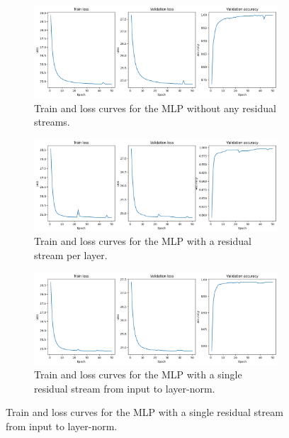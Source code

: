 \begin{figure}
    \centering
    \begin{subfigure}{0.9\textwidth}
        \includegraphics[width=\textwidth]{figures/no-residual-train-curves.png}
        \caption{Train and loss curves for the MLP without any residual streams.}
        \label{fig:nr-train-curves}
    \end{subfigure}

    \begin{subfigure}{0.9\textwidth}
        \includegraphics[width=\textwidth]{figures/residual-train-curves.png}
        \caption{Train and loss curves for the MLP with a residual stream per layer.}
        \label{fig:r-train-curves}
    \end{subfigure}

    \begin{subfigure}{0.9\textwidth}
        \includegraphics[width=\textwidth]{figures/single-residual-train-curves.png}
        \caption{Train and loss curves for the MLP with a single residual stream from input to layer-norm.}
        \label{fig:sr-train-curves}
    \end{subfigure}
\end{figure}

